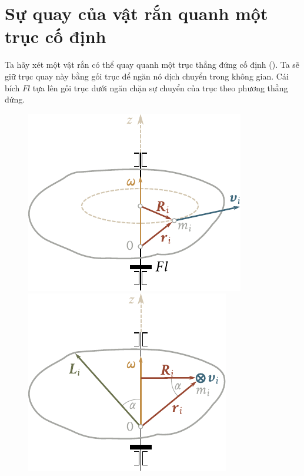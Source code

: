 \section{Sự quay của vật rắn quanh một trục cố định}\label{sec:5_3}

Ta hãy xét một vật rắn có thể quay quanh một trục thẳng đứng cố định (). Ta sẽ giữ trục quay này bằng gối trục để ngăn nó dịch chuyển trong không gian. Cái bích $Fl$ tựa lên gối trục dưới ngăn chặn sự chuyển của trục theo phương thẳng đứng.

\begin{figure}[!htb]
	\begin{minipage}[t]{0.5\linewidth}
		\begin{center}
			\includegraphics[scale=0.95]{figures/ch_05/fig_5_3.pdf}
			\caption[]{}
			\label{fig:5_3}
		\end{center}
	\end{minipage}
	\hspace{-0.05cm}
	\begin{minipage}[t]{0.5\linewidth}
		\begin{center}
			\includegraphics[scale=0.95]{figures/ch_05/fig_5_4.pdf}
			\caption[]{}
			\label{fig:5_4}
		\end{center}
	\end{minipage}
\end{figure}

